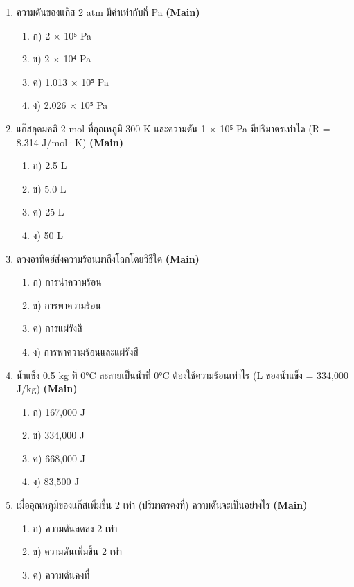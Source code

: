 \documentclass[12pt]{article}
\begin{document}
\begin{enumerate}[label=\arabic*.]
\begin{enumerate}[label=)]
\item ค) สุญญากาศ
\item ง) โลหะเท่านั้น
\end{enumerate}
\item ความดันของแก๊ส 2 atm มีค่าเท่ากับกี่ Pa \hfill \textbf{\small (Main)}
\begin{enumerate}[label=)]
\item ก) 2 × 10⁵ Pa
\item ข) 2 × 10⁴ Pa
\item ค) 1.013 × 10⁵ Pa
\item ง) 2.026 × 10⁵ Pa
\end{enumerate}
\item แก๊สอุดมคติ 2 mol ที่อุณหภูมิ 300 K และความดัน 1 × 10⁵ Pa มีปริมาตรเท่าใด (R = 8.314 J/mol·K) \hfill \textbf{\small (Main)}
\begin{enumerate}[label=)]
\item ก) 2.5 L
\item ข) 5.0 L
\item ค) 25 L
\item ง) 50 L
\end{enumerate}
\item ดวงอาทิตย์ส่งความร้อนมาถึงโลกโดยวิธีใด \hfill \textbf{\small (Main)}
\begin{enumerate}[label=)]
\item ก) การนำความร้อน
\item ข) การพาความร้อน
\item ค) การแผ่รังสี
\item ง) การพาความร้อนและแผ่รังสี
\end{enumerate}
\item น้ำแข็ง 0.5 kg ที่ 0°C ละลายเป็นน้ำที่ 0°C ต้องใช้ความร้อนเท่าไร (L ของน้ำแข็ง = 334,000 J/kg) \hfill \textbf{\small (Main)}
\begin{enumerate}[label=)]
\item ก) 167,000 J
\item ข) 334,000 J
\item ค) 668,000 J
\item ง) 83,500 J
\end{enumerate}
\item เมื่ออุณหภูมิของแก๊สเพิ่มขึ้น 2 เท่า (ปริมาตรคงที่) ความดันจะเป็นอย่างไร \hfill \textbf{\small (Main)}
\begin{enumerate}[label=)]
\item ก) ความดันลดลง 2 เท่า
\item ข) ความดันเพิ่มขึ้น 2 เท่า
\item ค) ความดันคงที่

\end{enumerate}
\end{enumerate}
\end{document}
